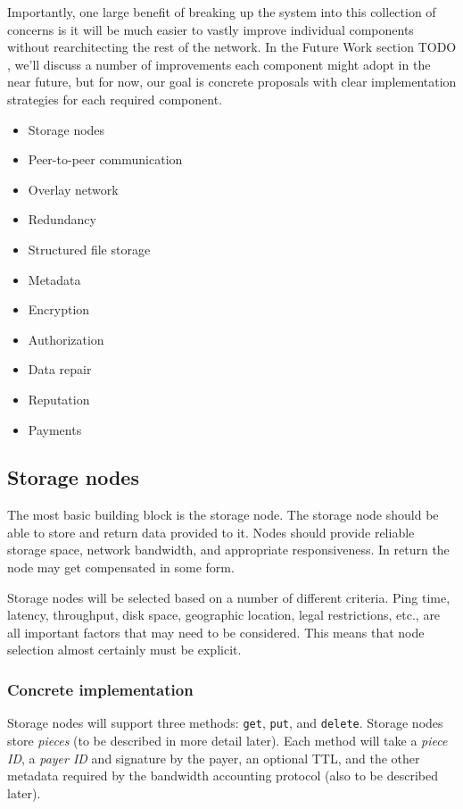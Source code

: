 \documentclass[a4paper,10pt]{article}
\newcommand{\code}[1]{{\tt #1}}
\newcommand{\todo}[1]{{\color{red} TODO #1}}
\begin{document}
Importantly, one large benefit of breaking up
the system into this collection of concerns is it will be much easier to
vastly improve individual components without rearchitecting the rest of the
network. In the Future Work section \todo{}, we'll discuss a number of
improvements each component might adopt in the near future, but for now, our
goal is concrete proposals with clear implementation strategies for each
required component.

\begin{itemize}
\item Storage nodes
\item Peer-to-peer communication
\item Overlay network
\item Redundancy
\item Structured file storage
\item Metadata
\item Encryption
\item Authorization
\item Data repair
\item Reputation
\item Payments
\end{itemize}

\subsection{Storage nodes}

The most basic building block is the storage node. The storage node should be
able to store and return data provided to it. Nodes should provide reliable
storage space, network bandwidth, and appropriate responsiveness. In return the
node may get compensated in some form.

Storage nodes will be selected based on a number of different criteria.
Ping time, latency, throughput, disk space, geographic location, legal
restrictions, etc., are all important factors that may need to be considered.
This means that node selection almost certainly must be explicit.

\subsubsection{Concrete implementation}

Storage nodes will support three methods: \code{get}, \code{put}, and
\code{delete}.
Storage nodes store {\em pieces} (to be described in more detail later).
Each method will take
  a {\em piece ID},
  a {\em payer ID} and signature by the payer,
  an optional TTL,
  and the other metadata required by the bandwidth accounting protocol (also
    to be described later).
\end{document}
